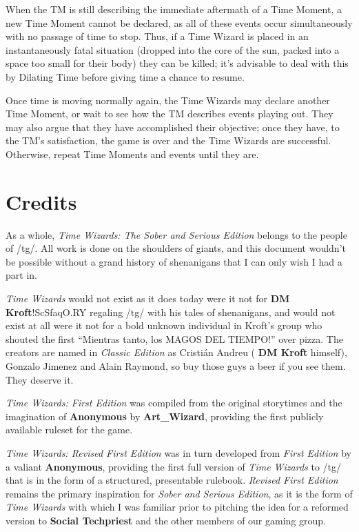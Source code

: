 \documentclass[twoside]{article}
\newcommand{\twsse}{\emph{Time Wizards: The Sober and Serious Edition}}
\newcommand{\tw}{\emph{Time Wizards}}
\newcommand{\sse}{\emph{Sober and Serious Edition}}
\newcommand{\rfe}{\emph{Revised First Edition}}
\newcommand{\anon}[1][]{{\color{anongreen} \textbf{Anonymous}#1}}
\newcommand{\namefag}[2][]{{\color{anongreen} \textbf{#2}#1}}
\begin{document}
When the TM is still describing the immediate aftermath of a Time Moment, a new Time Moment
cannot be declared, as all of these events occur simultaneously with no passage of time to stop.
Thus, if a Time Wizard is placed in an instantaneously fatal situation (dropped into the core
of the sun, packed into a space too small for their body) they can be killed; it's advisable to
deal with this by Dilating Time before giving time a chance to resume.

Once time is moving normally again, the Time Wizards may declare another Time Moment, or wait
to see how the TM describes events playing out. They may also argue that they have accomplished
their objective; once they have, to the TM's satisfaction, the game is over and the Time Wizards
are successful. Otherwise, repeat Time Moments and events until they are.

\clearpage

\section{Credits}
As a whole, \twsse{} belongs to the people of /tg/. All work is done on the shoulders of giants,
and this document wouldn't be possible without a grand history of shenanigans that I can only
wish I had a part in.

\tw{} would not exist as it does today were it not for \namefag[!ScSfaqO.RY]{DM Kroft} regaling
/tg/ with his tales of shenanigans, and would not exist at all were it not for a bold unknown
individual in Kroft's group who shouted the first ``Mientras tanto, los MAGOS DEL TIEMPO!'' over
pizza. The creators are named in \emph{Classic Edition} as Cristi\'{a}n Andreu (\namefag{DM
Kroft} himself), Gonzalo Jimenez and Alain Raymond, so buy those guys a beer if you see them.
They deserve it.

\emph{Time Wizards: First Edition} was compiled from the original storytimes and the imagination
of \anon{} by \namefag{Art\_Wizard}, providing the first publicly available ruleset for the game.

\emph{Time Wizards: Revised First Edition} was in turn developed from \emph{First Edition} by a
valiant \anon{}, providing the first full version of \tw{} to /tg/ that is in the form of a
structured, presentable rulebook. \rfe{} remains the primary inspiration for \sse{}, as it is the
form of \tw{} with which I was familiar prior to pitching the idea for a reformed version to
\namefag{Social Techpriest} and the other members of our gaming group.
\end{document}

